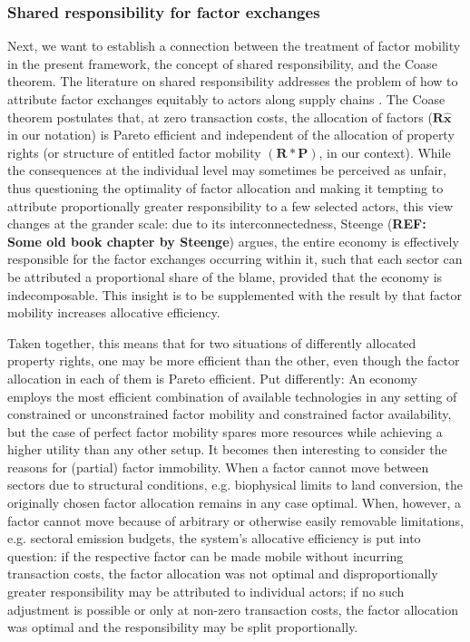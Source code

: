 \subsubsection{Shared responsibility for factor exchanges}

Next, we want to establish a connection between the treatment of factor mobility in the present framework, the concept of shared responsibility, and the Coase theorem. The literature on shared responsibility addresses the problem of how to attribute factor exchanges equitably to actors along supply chains \parencite[see for example][]{lenzen_2007}. The Coase theorem \parencite[based on][]{coase_1960} postulates that, at zero transaction costs, the allocation of factors ($\bm{R} \widehat{\bm{x}}$ in our notation) is Pareto efficient and independent of the allocation of property rights (or structure of entitled factor mobility $(\bm{R} \ast \bm{P})$, in our context). While the consequences at the individual level may sometimes be perceived as unfair, thus questioning the optimality of factor allocation and making it tempting to attribute proportionally greater responsibility to a few selected actors, this view changes at the grander scale: due to its interconnectedness, Steenge (\textbf{REF: Some old book chapter by Steenge}) argues, the entire economy is effectively responsible for the factor exchanges occurring within it, such that each sector can be attributed a proportional share of the blame, provided that the economy is indecomposable. This insight is to be supplemented with the result by \textcite{amores_2014} that factor mobility increases allocative efficiency.

Taken together, this means that for two situations of differently allocated property rights, one may be more efficient than the other, even though the factor allocation in each of them is Pareto efficient. Put differently: An economy employs the most efficient combination of available technologies in any setting of constrained or unconstrained factor mobility and constrained factor availability, but the case of perfect factor mobility spares more resources while achieving a higher utility than any other setup. It becomes then interesting to consider the reasons for (partial) factor immobility. When a factor cannot move between sectors due to structural conditions, e.g. biophysical limits to land conversion, the originally chosen factor allocation remains in any case optimal. When, however, a factor cannot move because of arbitrary or otherwise easily removable limitations, e.g. sectoral emission budgets, the system's allocative efficiency is put into question: if the respective factor can be made mobile without incurring transaction costs, the factor allocation was not optimal and disproportionally greater responsibility may be attributed to individual actors; if no such adjustment is possible or only at non-zero transaction costs, the factor allocation was optimal and the responsibility may be split proportionally.

